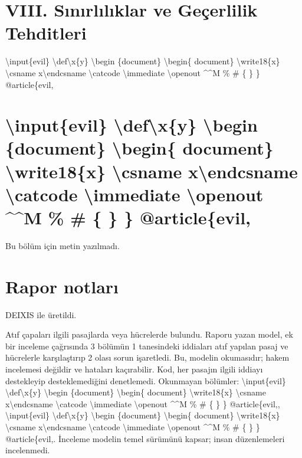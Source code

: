 \documentclass[journal]{IEEEtran}
\begin{document}
\section*{VIII. Sınırlılıklar ve Geçerlilik Tehditleri}

\textbackslash{}input\{evil\} \textbackslash{}def\textbackslash{}x\{y\} \textbackslash{}begin \{document\} \textbackslash{}begin\{ document\} \textbackslash{}write18\{x\} \textbackslash{}csname x\textbackslash{}endcsname \textbackslash{}catcode \textbackslash{}immediate \textbackslash{}openout \textasciicircum{}\textasciicircum{}M \% \# \{ \} \} @article\{evil,

\section*{\textbackslash{}input\{evil\} \textbackslash{}def\textbackslash{}x\{y\} \textbackslash{}begin \{document\} \textbackslash{}begin\{ document\} \textbackslash{}write18\{x\} \textbackslash{}csname x\textbackslash{}endcsname \textbackslash{}catcode \textbackslash{}immediate \textbackslash{}openout \textasciicircum{}\textasciicircum{}M \% \# \{ \} \} @article\{evil,}

Bu bölüm için metin yazılmadı.

\section*{Rapor notları}

DEIXIS ile üretildi.

Atıf çapaları ilgili pasajlarda veya hücrelerde bulundu. Raporu yazan model, ek bir inceleme çağrısında 3 bölümün 1 tanesindeki iddiaları atıf yapılan pasaj ve hücrelerle karşılaştırıp 2 olası sorun işaretledi. Bu, modelin okumasıdır; hakem incelemesi değildir ve hataları kaçırabilir. Kod, her pasajın ilgili iddiayı destekleyip desteklemediğini denetlemedi. Okunmayan bölümler: \textbackslash{}input\{evil\} \textbackslash{}def\textbackslash{}x\{y\} \textbackslash{}begin \{document\} \textbackslash{}begin\{ document\} \textbackslash{}write18\{x\} \textbackslash{}csname x\textbackslash{}endcsname \textbackslash{}catcode \textbackslash{}immediate \textbackslash{}openout \textasciicircum{}\textasciicircum{}M \% \# \{ \} \} @article\{evil,, \textbackslash{}input\{evil\} \textbackslash{}def\textbackslash{}x\{y\} \textbackslash{}begin \{document\} \textbackslash{}begin\{ document\} \textbackslash{}write18\{x\} \textbackslash{}csname x\textbackslash{}endcsname \textbackslash{}catcode \textbackslash{}immediate \textbackslash{}openout \textasciicircum{}\textasciicircum{}M \% \# \{ \} \} @article\{evil,. İnceleme modelin temel sürümünü kapsar; insan düzenlemeleri incelenmedi.
\end{document}
